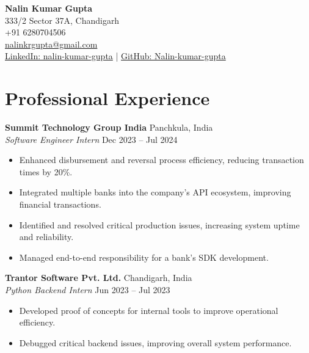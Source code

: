 \documentclass[a4paper,10pt]{article}
\begin{document}
\begin{center}
    {\LARGE \textbf{Nalin Kumar Gupta}} \\
    333/2 Sector 37A, Chandigarh \\
    +91 6280704506 \\
    \href{mailto:nalinkrgupta@gmail.com}{nalinkrgupta@gmail.com} \\
    \href{https://www.linkedin.com/in/nalin-kumar-gupta-450a98270/}{LinkedIn: nalin-kumar-gupta} | 
    \href{https://github.com/Nalin-kumar-gupta}{GitHub: Nalin-kumar-gupta} \\
\end{center}

\vspace{-1mm}

\section*{Professional Experience}

\textbf{Summit Technology Group India} \hfill Panchkula, India \\
\textit{Software Engineer Intern} \hfill Dec 2023 – Jul 2024 \\
\vspace{-5mm}
\begin{itemize}[noitemsep]
    \item Enhanced disbursement and reversal process efficiency, reducing transaction times by 20\%.
    \item Integrated multiple banks into the company's API ecosystem, improving financial transactions.
    \item Identified and resolved critical production issues, increasing system uptime and reliability.
    \item Managed end-to-end responsibility for a bank's SDK development.
\end{itemize}

\vspace{-1mm}
\textbf{Trantor Software Pvt. Ltd.} \hfill Chandigarh, India \\
\textit{Python Backend Intern} \hfill Jun 2023 – Jul 2023 \\
\vspace{-5mm}
\begin{itemize}[noitemsep]
    \item Developed proof of concepts for internal tools to improve operational efficiency.
    \item Debugged critical backend issues, improving overall system performance.
\end{itemize}
\end{document}
